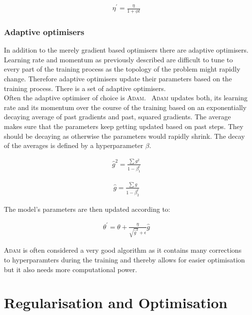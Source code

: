 \begin{align}
    \eta^{\prime} = \frac{\eta}{1 + \phi t}
\end{align}

\subsubsection{Adaptive optimisers}

In addition to the merely gradient based optimisers there are adaptive optimisers. Learning rate and momentum as previously described are difficult to tune to every part of the training process as the topology of the problem might rapidly change. Therefore adaptive optimisers update their parameters based on the training process. There is a set of adaptive optimisers.~\cite{chollet2015keras}\\
Often the adaptive optimiser of choice is \textsc{Adam}.~\cite{2014arXiv1412.6980K} \textsc{Adam} updates both, its learning rate and its momentum over the course of the training based on an exponentially decaying average of past gradients and past, squared gradients. The average makes sure that the parameters keep getting updated based on past steps. They should be decaying as otherwise the parameters would rapidly shrink. The decay of the averages is defined by a hyperparameter $\beta$.

\begin{align}
    \hat{g}^2 = \frac{\sum g^2}{1 - \beta_1^t}
\end{align}

\begin{align}
    \hat{g} = \frac{\sum g}{1 - \beta_2^t}
\end{align}

The model's parameters are then updated according to:

\begin{align}
    \theta^{\prime} = \theta + \frac{\eta}{\sqrt{\hat{g}^2} + \epsilon} \hat{g}
\end{align}

\textsc{Adam} is often considered a very good algorithm as it contains many corrections to hyperparamters during the training and thereby allows for easier optimisation but it also needs more computational power.


\section{Regularisation and Optimisation}

